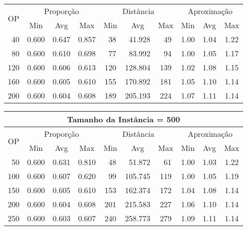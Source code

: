 \begin{table}[htbp]
\begin{center}
{\begin{tabular}{|c|c|c|c|c|c|c|c|c|c|}
\multirow{2}{*}{OP} & \multicolumn{3}{c|}{Proporção} & \multicolumn{3}{c|}{Distância} & \multicolumn{3}{c|}{Aproximação}   \\ \cline{2-10}
                    & Min       & Avg      & Max      & Min      & Avg      & Max     & Min     & Avg    & Max             \\ \hline
~40                 & 0.600     & 0.647    & 0.857    & ~38      & ~41.928  & ~49     & 1.00    & 1.04   & 1.22            \\ \hline
~80                 & 0.600     & 0.610    & 0.698    & ~77      & ~83.992  & ~94     & 1.00    & 1.05   & 1.17            \\ \hline
120                 & 0.600     & 0.606    & 0.613    & 120      & 128.804  & 139     & 1.02    & 1.08   & 1.15            \\ \hline
160                 & 0.600     & 0.605    & 0.610    & 155      & 170.892  & 181     & 1.05    & 1.10   & 1.14            \\ \hline
200                 & 0.600     & 0.604    & 0.608    & 189      & 205.193  & 224     & 1.07    & 1.11   & 1.14            \\ \hline
\end{tabular}%
\vspace{5pt}
\begin{tabular}{|c|c|c|c|c|c|c|c|c|c|}
\hline
\multicolumn{10}{|c|}{\bf Tamanho da Instância = 500}                                                                          \\ \hline
\multirow{2}{*}{OP} & \multicolumn{3}{c|}{Proporção} & \multicolumn{3}{c|}{Distância} & \multicolumn{3}{c|}{Aproximação}   \\ \cline{2-10}
                    & Min       & Avg      & Max      & Min      & Avg      & Max     & Min     & Avg    & Max             \\ \hline
~50                 & 0.600     & 0.631    & 0.810    & ~48      & ~51.872  & ~61     & 1.00    & 1.03   & 1.22            \\ \hline
100                 & 0.600     & 0.607    & 0.620    & ~99      & 105.745  & 119     & 1.00    & 1.05   & 1.19            \\ \hline
150                 & 0.600     & 0.605    & 0.610    & 153      & 162.374  & 172     & 1.04    & 1.08   & 1.14            \\ \hline
200                 & 0.600     & 0.604    & 0.608    & 201      & 215.583  & 227     & 1.06    & 1.10   & 1.14            \\ \hline
250                 & 0.600     & 0.603    & 0.607    & 240      & 258.773  & 279     & 1.09    & 1.11   & 1.14            \\ \hline
\end{tabular}%
}
\end{center}
\end{table}
